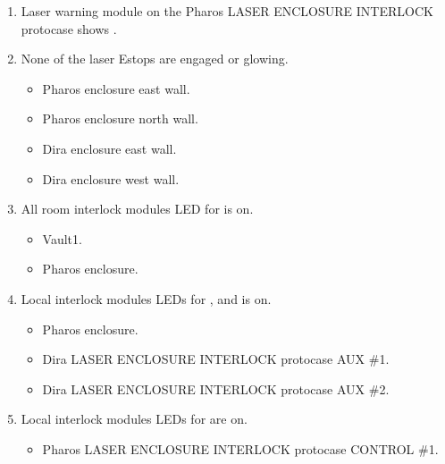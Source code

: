 \documentclass[letterpaper,10pt,english]{sphinxmanual}
\begin{document}
\begin{enumerate}
\item {} 
\sphinxAtStartPar
Laser warning module on the Pharos LASER ENCLOSURE INTERLOCK protocase shows .

\item {} 
\sphinxAtStartPar
None of the laser E\sphinxhyphen{}stops are engaged or glowing.
\begin{itemize}
\item {} 
\sphinxAtStartPar
Pharos enclosure east wall.

\item {} 
\sphinxAtStartPar
Pharos enclosure north wall.

\item {} 
\sphinxAtStartPar
Dira enclosure east wall.

\item {} 
\sphinxAtStartPar
Dira enclosure west wall.

\end{itemize}

\item {} 
\sphinxAtStartPar
All room interlock modules LED for  is on.
\begin{itemize}
\item {} 
\sphinxAtStartPar
Vault\sphinxhyphen{}1.

\item {} 
\sphinxAtStartPar
Pharos enclosure.

\end{itemize}

\item {} 
\sphinxAtStartPar
Local interlock modules LEDs for , and  is on.
\begin{itemize}
\item {} 
\sphinxAtStartPar
Pharos enclosure.

\item {} 
\sphinxAtStartPar
Dira LASER ENCLOSURE INTERLOCK protocase AUX \#1.

\item {} 
\sphinxAtStartPar
Dira LASER ENCLOSURE INTERLOCK protocase AUX \#2.

\end{itemize}

\item {} 
\sphinxAtStartPar
Local interlock modules LEDs for  are on.
\begin{itemize}
\item {} 
\sphinxAtStartPar
Pharos LASER ENCLOSURE INTERLOCK protocase CONTROL \#1.


\end{itemize}
\end{enumerate}
\end{document}
